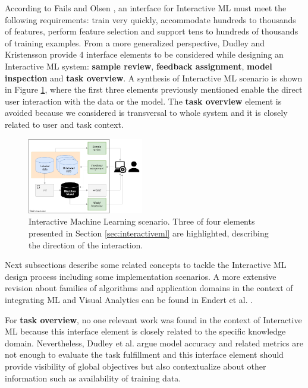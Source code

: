 According to Fails and Olsen \cite{Fails2003}, an interface for Interactive ML must meet the following requirements: train very quickly, accommodate hundreds to thousands of features, perform feature selection and support tens to hundreds of thousands of training examples. From a more generalized perspective, Dudley and Kristensson \cite{Dudley2018} provide 4 interface elements to be considered while designing an Interactive ML system: \textbf{sample review}, \textbf{feedback assignment}, \textbf{model inspection} and \textbf{task overview}. A synthesis of Interactive ML scenario is shown in Figure \ref{fig:InteractiveML}, where the first three elements previously mentioned enable the direct user interaction with the data or the model. The \textbf{task overview} element is avoided because we considered is transversal to whole system and it is closely related to user and task context. 

\begin{figure}[ht]
 \centering
 \includegraphics[width=0.45\textwidth]{InteractiveML.png}
 \caption{Interactive Machine Learning scenario. Three of four elements presented in Section \ref{sec:interactiveml} are highlighted, describing the direction of the interaction.}
 \label{fig:InteractiveML}
\end{figure}

Next subsections describe some related concepts to tackle the Interactive ML design process including some implementation scenarios. A more extensive revision about families of algorithms and application domains in the context of integrating ML and Visual Analytics can be found in Endert et al. \cite{Endert2017b}.

For \textbf{task overview}, no one relevant work was found in the context of Interactive ML because this interface element is closely related to the specific knowledge domain. Nevertheless, Dudley et al. \cite{Dudley2018} argue model accuracy and related metrics are not enough to evaluate the task fulfillment and this interface element should provide visibility of global objectives but also contextualize about other information such as availability of training data.

